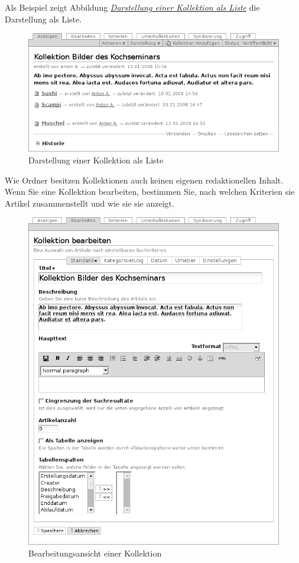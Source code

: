 \documentclass[a4paper,12pt,ngerman]{manual}
\begin{document}
Als Beispiel zeigt Abbildung \hyperlink{fig-thema}{\emph{Darstellung einer Kollektion als Liste}} die Darstellung als Liste.
\hypertarget{fig-thema}{}\begin{figure}[htbp]
\centering

\includegraphics{thema.png}
\caption{Darstellung einer Kollektion als Liste}\end{figure}

Wie Ordner besitzen Kollektionen auch keinen eigenen
redaktionellen Inhalt. Wenn Sie eine Kollektion bearbeiten, bestimmen Sie,
nach welchen Kriterien sie Artikel zusammenstellt und wie sie sie anzeigt.
\hypertarget{fig-kollektion-bearbeiten}{}\begin{figure}[htbp]
\centering

\includegraphics{kollektion-bearbeiten.png}
\caption{Bearbeitungsansicht einer Kollektion}\end{figure}
\end{document}

